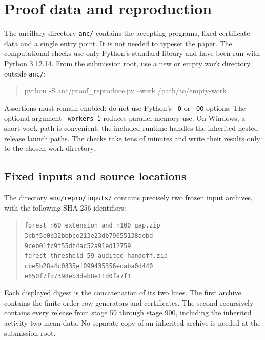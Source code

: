 \section{Proof data and reproduction}\label{app:repro}

The ancillary directory \nolinkurl{anc/} contains the accepting programs,
fixed certificate data and a single entry point. It is not needed to
typeset the paper. The computational checks use only Python's standard
library and have been run with Python 3.12.14. From the submission
root, use a new or empty work directory outside \nolinkurl{anc/}:
\begin{quote}\small\ttfamily
python -S anc/proof\_reproduce.py --work /path/to/empty-work
\end{quote}
Assertions must remain enabled: do not use Python's \texttt{-O} or
\texttt{-OO} options. The optional argument \texttt{--workers 1} reduces
parallel memory use. On Windows, a short work path is convenient; the
included runtime handles the inherited nested-release launch paths.
The checks take tens of minutes and write their results only to the
chosen work directory.

\subsection{Fixed inputs and source locations}
The directory \nolinkurl{anc/repro/inputs/} contains precisely two frozen
input archives, with the following SHA-256 identifiers:
\begin{quote}\small
\nolinkurl{forest_n60_extension_and_n100_gap.zip}\\
\texttt{3cbf5c0b32bbbce213e23db79655138aebd}\\
\texttt{9ceb01fc9f55df4ac52a91ed12759}\\[4pt]
\nolinkurl{forest_threshold_59_audited_handoff.zip}\\
\texttt{cbe5b28a4c0335ef099435356edaba0d440}\\
\texttt{e650f7fd7398eb3dab8e11d0fa7f1}
\end{quote}
Each displayed digest is the concatenation of its two lines. The first
archive contains the finite-order row generators and certificates. The
second recursively contains every release from stage 59 through stage
900, including the inherited activity-two mean data. No separate copy
of an inherited archive is needed at the submission root.

